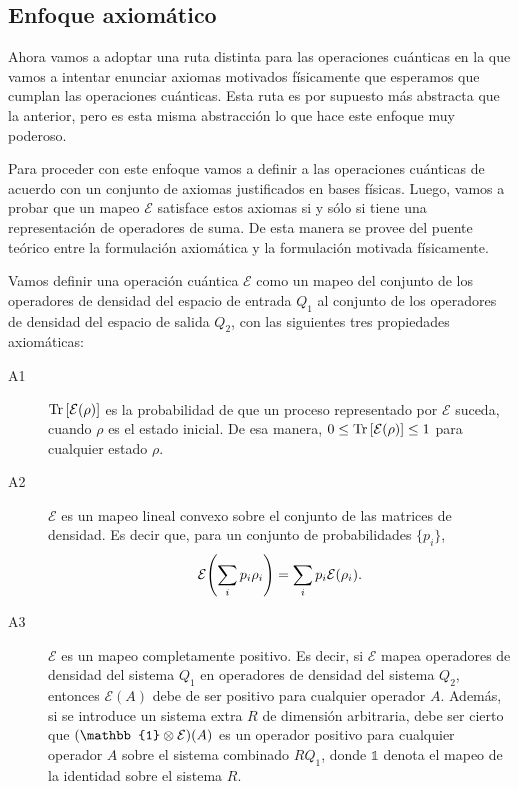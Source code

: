 \documentclass[11pt,dvipsnames]{report}
\newcommand{\E}{\mathcal{E}}
\begin{document}
\subsection{Enfoque axiomático}
Ahora vamos a adoptar una ruta distinta para las operaciones cuánticas
en la que vamos a intentar enunciar axiomas motivados físicamente que
esperamos que cumplan las operaciones cuánticas. Esta ruta es por supuesto
más abstracta que la anterior, pero es esta misma abstracción lo que hace
este enfoque muy poderoso.

Para proceder con este enfoque vamos a definir a las operaciones 
cuánticas de acuerdo con un conjunto de axiomas justificados en
bases físicas. Luego, vamos a probar que un mapeo $\E$ satisface
estos axiomas si y sólo si tiene una representación de operadores
de suma. De esta manera se provee del puente teórico entre 
la formulación axiomática y la formulación motivada físicamente.

Vamos definir una operación cuántica $\E$ como un mapeo del conjunto
de los operadores de densidad del espacio de entrada $Q_1$ al 
conjunto de los operadores de densidad del espacio de salida $Q_2$,
con las siguientes tres propiedades axiomáticas:
\begin{description}
	\item[A1] \label{axiom1}
	$\Tr \qty[\E (\rho)]$ es la probabilidad de que un proceso
	representado por $\E$ suceda, cuando $\rho$ es el estado inicial. 
	De esa manera, $0\leq \Tr \qty[\E (\rho)]\leq 1$ para cualquier
	estado $\rho$.
	\item[A2] $\E$ es un mapeo lineal convexo sobre el conjunto de las 
	matrices de densidad. Es decir que, para un conjunto
	de probabilidades $\{ p_i\}$,
	\begin{align}
		\E \qty(\sum _i p_i\rho_i) = \sum _i p_i \E \qty(\rho_i).
		\label{eq:qtmOp-a2}
	\end{align}
	\item[A3] $\E$ es un mapeo completamente positivo. Es decir, si $\E$ 
	mapea operadores de densidad del sistema $Q_1$ en operadores de
	densidad del sistema $Q_2$, entonces $\E (A)$ debe de ser positivo
	para cualquier operador $A$. Además, si se introduce un sistema
	extra $R$ de dimensión arbitraria, debe ser cierto que $\qty(
	\mathbb{1}\otimes \E)(A)$ es un operador positivo para cualquier
	operador $A$ sobre el sistema combinado $RQ_1$, donde $\mathbb{1}$
	denota el mapeo de la identidad sobre el sistema $R$.
\end{description}
\end{document}
